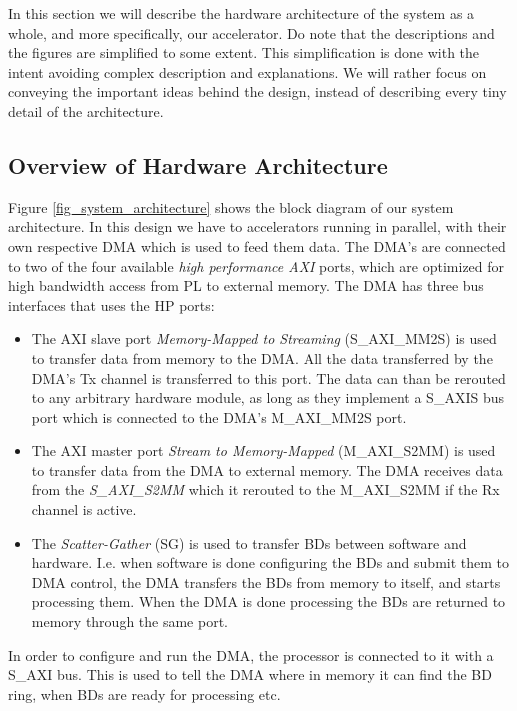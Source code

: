 In this section we will describe the hardware architecture of the system as a whole, and more specifically, our accelerator. Do note that the descriptions and the figures are simplified to some extent. This simplification is done with the intent avoiding complex description and explanations. We will rather focus on conveying the important ideas behind the design, instead of describing every tiny detail of the architecture. 

\subsection{Overview of Hardware Architecture}

Figure \ref{fig_system_architecture} shows the block diagram of our system architecture. In this design we have to accelerators running in parallel, with their own respective DMA which is used to feed them data. The DMA's are connected to two of the four available \textit{high performance AXI} ports, which are optimized for high bandwidth access from PL to external memory. The DMA has three bus interfaces that uses the HP ports:

\begin{itemize}
\item The AXI slave port \textit{Memory-Mapped to Streaming} (S\_AXI\_MM2S) is used to transfer data from memory to the DMA. All the data transferred by the DMA's Tx channel is transferred to this port. The data can than be rerouted to any arbitrary hardware module, as long as they implement a S\_AXIS bus port which is connected to the DMA's M\_AXI\_MM2S port. 
\item The AXI master port \textit{Stream to Memory-Mapped} (M\_AXI\_S2MM) is used to transfer data from the DMA to external memory. The DMA receives data from the \textit{S\_AXI\_S2MM} which it rerouted to the M\_AXI\_S2MM if the Rx channel is active.
\item The \textit{Scatter-Gather} (SG) is used to transfer BDs between software and hardware. I.e. when software is done configuring the BDs and submit them to DMA control, the DMA transfers the BDs from memory to itself, and starts processing them. When the DMA is done processing the BDs are returned to memory through the same port. 
\end{itemize}

In order to configure and run the DMA, the processor is connected to it with a S\_AXI bus. This is used to tell the DMA where in memory it can find the BD ring, when BDs are ready for processing etc.

